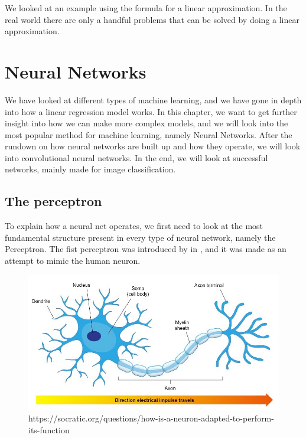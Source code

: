  
We looked at an example using the formula for a linear approximation. In the real world there are only a handful problems that can be solved by doing a linear approximation.

    

   
      

    
\section{Neural Networks}
We have looked at different types of machine learning, and we have gone in depth into how a linear regression model works. In this chapter, we want to get further insight into how we can make more complex models, and we will look into the most popular method for machine learning, namely Neural Networks. 
After the rundown on how neural networks are built up and how they operate, we will look into convolutional neural networks. In the end, we will look at successful networks, mainly made for image classification.


\subsection{The perceptron}
\label{chap:perceptron}
To explain how a neural net operates, we first need to look at the most fundamental structure present in every type of neural network, namely the Perceptron.
The fist perceptron was introduced by  in , and it was made as an attempt to mimic the human neuron.  


\begin{figure}[h]
        \centering
        \includegraphics[scale=0.5]{background/figures/neuron.jpg}
        \caption{https://socratic.org/questions/how-is-a-neuron-adapted-to-perform-its-function}
        \label{fig:neuron}
\end{figure}

